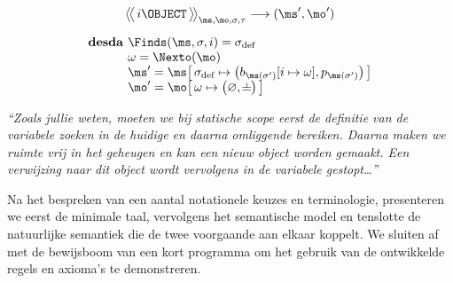 \begin{htmlskip}
  \begin{multicols}{2}
    \small
    \raggedcolumns
    \setlength{\columnseprule}{.5pt}
    \begin{minipage}{.25\textwidth}\vspace*{-1.1pc}%
\begin{gather*}
  \AxiomC{$
    \Config{i \OBJECT}{\ms, \mo, \sigma, \tau}
    \longrightarrow
    (\ms', \mo')
  $}
  {\DisplayProof} \\[5pt]
  \begin{array}{r@{}l}%
    \textbf{desda } & \Finds(\ms, \sigma, i) = \sigma_\text{def} \\
    & \omega = \Nexto(\mo) \\
    & \ms' = \ms \surr{ \sigma_\text{def} \mapsto \big(b_{\ms(\sigma')}[i\mapsto \omega], p_{\ms(\sigma')}\big) } \\
    & \mo' = \mo \surr{ \omega \mapsto \big(\varnothing, \nil\big) }
  \end{array}
\end{gather*}%
    \end{minipage}
    
    \columnbreak
    
    \textit{“Zoals jullie weten, moeten we bij statische scope eerst de definitie van de variabele zoeken in de huidige en daarna omliggende bereiken. Daarna maken we ruimte vrij in het geheugen en kan een nieuw object worden gemaakt. Een verwijzing naar dit object wordt vervolgens in de variabele gestopt\dots”}
  \end{multicols}
\end{htmlskip}

Na het bespreken van een aantal notationele keuzes en terminologie, presenteren we eerst de minimale taal, vervolgens het semantische model en tenslotte de natuurlijke semantiek die de twee voorgaande aan elkaar koppelt.
We sluiten af met de bewijsboom van een kort programma om het gebruik van de ontwikkelde regels en axioma's te demonstreren.

